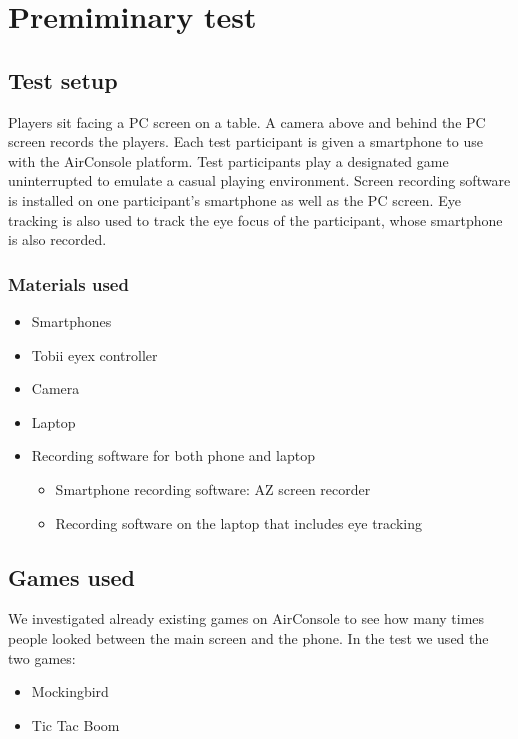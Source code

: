 \chapter{Premiminary test}\label{ch:PreTest}
\section{Test setup}
Players sit facing a PC screen on a table. A camera above and behind the PC screen records the players. Each test participant is given a smartphone to use with the AirConsole platform. Test participants play a designated game uninterrupted to emulate a casual playing environment. Screen recording software is installed on one participant’s smartphone as well as the PC screen. Eye tracking is also used to track the eye focus of the participant, whose smartphone is also recorded.


\subsection{Materials used}
\begin{itemize}
\item Smartphones
\item Tobii eyex controller
\item Camera
\item Laptop
\item Recording software for both phone and laptop
\begin{itemize}
	\item Smartphone recording software: AZ screen recorder
	\item Recording software on the laptop that includes eye tracking
\end{itemize}
\end{itemize}

	
\section{Games used}
We investigated already existing games on AirConsole to see how many times people looked between the main screen and the phone. In the test we used the two games:
\begin{itemize}
\item Mockingbird
\item Tic Tac Boom
\end{itemize}


